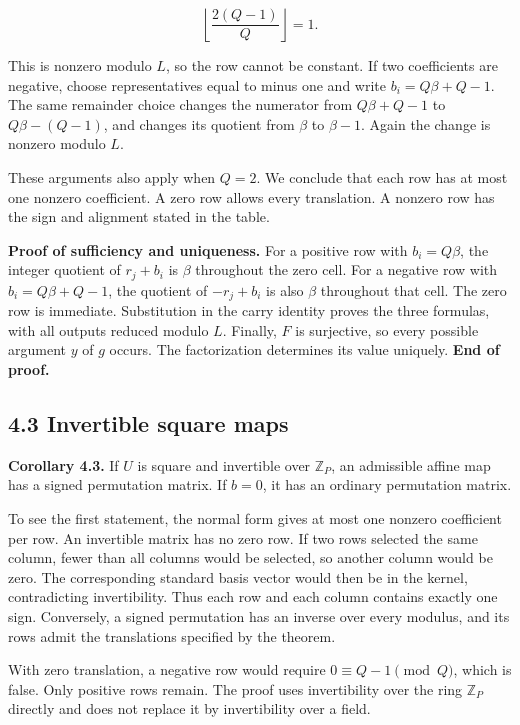 \documentclass[
]{article}
\begin{document}
\[
\left\lfloor\frac{2(Q-1)}Q\right\rfloor=1.
\]

This is nonzero modulo \(L\), so the row cannot be constant. If two
coefficients are negative, choose representatives equal to minus one and
write \(b_i=Q\beta+Q-1\). The same remainder choice changes the
numerator from \(Q\beta+Q-1\) to \(Q\beta-(Q-1)\), and changes its
quotient from \(\beta\) to \(\beta-1\). Again the change is nonzero
modulo \(L\).

These arguments also apply when \(Q=2\). We conclude that each row has
at most one nonzero coefficient. A zero row allows every translation. A
nonzero row has the sign and alignment stated in the table.

\textbf{Proof of sufficiency and uniqueness.} For a positive row with
\(b_i=Q\beta\), the integer quotient of \(r_j+b_i\) is \(\beta\)
throughout the zero cell. For a negative row with \(b_i=Q\beta+Q-1\),
the quotient of \(-r_j+b_i\) is also \(\beta\) throughout that cell. The
zero row is immediate. Substitution in the carry identity proves the
three formulas, with all outputs reduced modulo \(L\). Finally, \(F\) is
surjective, so every possible argument \(y\) of \(g\) occurs. The
factorization determines its value uniquely. \textbf{End of proof.}

\subsection{4.3 Invertible square maps}\label{invertible-square-maps}

\textbf{Corollary 4.3.} If \(U\) is square and invertible over
\(\mathbb Z_P\), an admissible affine map has a signed permutation
matrix. If \(b=0\), it has an ordinary permutation matrix.

To see the first statement, the normal form gives at most one nonzero
coefficient per row. An invertible matrix has no zero row. If two rows
selected the same column, fewer than all columns would be selected, so
another column would be zero. The corresponding standard basis vector
would then be in the kernel, contradicting invertibility. Thus each row
and each column contains exactly one sign. Conversely, a signed
permutation has an inverse over every modulus, and its rows admit the
translations specified by the theorem.

With zero translation, a negative row would require
\(0\equiv Q-1\pmod Q\), which is false. Only positive rows remain. The
proof uses invertibility over the ring \(\mathbb Z_P\) directly and does
not replace it by invertibility over a field.
\end{document}
